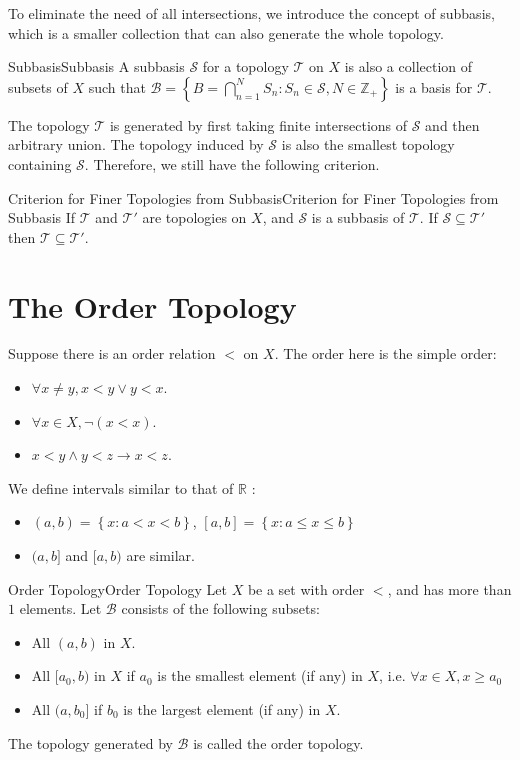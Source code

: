 \documentclass[../main.tex]{subfiles}
\begin{document}
To eliminate the need of all intersections, we introduce the concept of subbasis, which is a smaller collection that can also generate the whole topology.

\begin{definition}{Subbasis}{Subbasis}
A subbasis $\mathcal{S}$ for a topology $\mathcal{T}$ on $X$ is also a collection of subsets of $X$ such that $\mathcal{B} = \left\{ B = \bigcap_{n=1}^{N} S_n: S_n\in \mathcal{S}, N\in \mathbb{Z}_+ \right\}$ is a basis for $\mathcal{T}$.
\end{definition}
\begin{remark}
The topology $\mathcal{T}$ is generated by first taking finite intersections of $\mathcal{S}$ and then arbitrary union. The topology induced by $\mathcal{S}$ is also the smallest topology containing $\mathcal{S}$. Therefore, we still have the following criterion.
\end{remark}

\begin{theorem}{Criterion for Finer Topologies from Subbasis}{Criterion for Finer Topologies from Subbasis}
If $\mathcal{T}$ and $\mathcal{T}'$ are topologies on $X$, and $\mathcal{S}$ is a subbasis of $\mathcal{T}$. If $\mathcal{S} \subseteq \mathcal{T}'$ then $\mathcal{T} \subseteq \mathcal{T}'$.
\end{theorem}


\section{The Order Topology}

Suppose there is an order relation $<$ on $X$. The order here is the simple order:
\begin{itemize}
\item $\forall x\neq y, x<y\lor y<x$.
\item $\forall x\in X, \lnot (x<x)$.
\item $x<y\land y<z \rightarrow x<z$.
\end{itemize}
We define intervals similar to that of $\mathbb{R}$ :
\begin{itemize}
	\item $(a,b) = \left\{ x:a<x<b \right\}$, $[a,b] = \left\{ x: a\leq x\leq b \right\}$ 
	\item $(a,b]$ and $[a,b)$ are similar.
\end{itemize}

\begin{definition}{Order Topology}{Order Topology}
Let $X$ be a set with order $<$, and has more than $1$ elements. Let $\mathcal{B}$ consists of the following subsets:
\begin{itemize}
\item All $(a,b) $ in $X$.
\item All $[a_0,b)$ in $X$ if $a_0$ is the smallest element (if any) in $X$, i.e. $\forall x\in X, x \geq a_0$ 
\item All $(a,b_0]$ if $b_0$ is the largest element (if any) in $X$.
\end{itemize}

The topology generated by $\mathcal{B}$ is called the order topology.
\end{definition}
\end{document}

